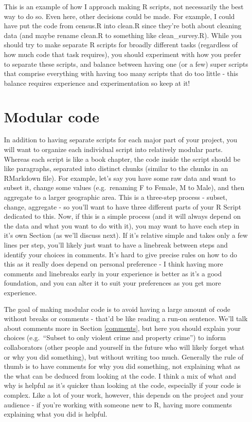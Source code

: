 \documentclass[
  12pt,
]{book}
\begin{document}
This is an example of how I approach making R scripts, not necessarily the best way to do so. Even here, other decisions could be made. For example, I could have put the code from census.R into clean.R since they're both about cleaning data (and maybe rename clean.R to something like clean\_survey.R). While you should try to make separate R scripts for broadly different tasks (regardless of how much code that task requires), you should experiment with how you prefer to separate these scripts, and balance between having one (or a few) super scripts that comprise everything with having too many scripts that do too little - this balance requires experience and experimentation so keep at it!

\hypertarget{modular-code}{%
\section{Modular code}\label{modular-code}}

In addition to having separate scripts for each major part of your project, you will want to organize each individual script into relatively modular parts. Whereas each script is like a book chapter, the code inside the script should be like paragraphs, separated into distinct chunks (similar to the chunks in an RMarkdown file). For example, let's say you have some raw data and want to subset it, change some values (e.g.~renaming F to Female, M to Male), and then aggregate to a larger geographic area. This is a three-step process - subset, change, aggregate - so you'll want to have three different parts of your R Script dedicated to this. Now, if this is a simple process (and it will always depend on the data and what you want to do with it), you may want to have each step in it's own Section (as we'll discuss next). If it's relative simple and takes only a few lines per step, you'll likely just want to have a linebreak between steps and identify your choices in comments. It's hard to give precise rules on how to do this as it really does depend on personal preference - I think having more comments and linebreaks early in your experience is better as it's a good foundation, and you can alter it to suit your preferences as you get more experience.

The goal of making modular code is to avoid having a large amount of code without breaks or comments - that'd be like reading a run-on sentence. We'll talk about comments more in Section \ref{comments}, but here you should explain your choices (e.g.~``Subset to only violent crime and property crime'') to inform collaborators (other people and yourself in the future who will likely forget what or why you did something), but without writing too much. Generally the rule of thumb is to have comments for why you did something, not explaining what as the what can be deduced from looking at the code. I think a mix of what and why is helpful as it's quicker than looking at the code, especially if your code is complex. Like a lot of your work, however, this depends on the project and your audience - if you're working with someone new to R, having more comments explaining what you did is helpful.
\end{document}
